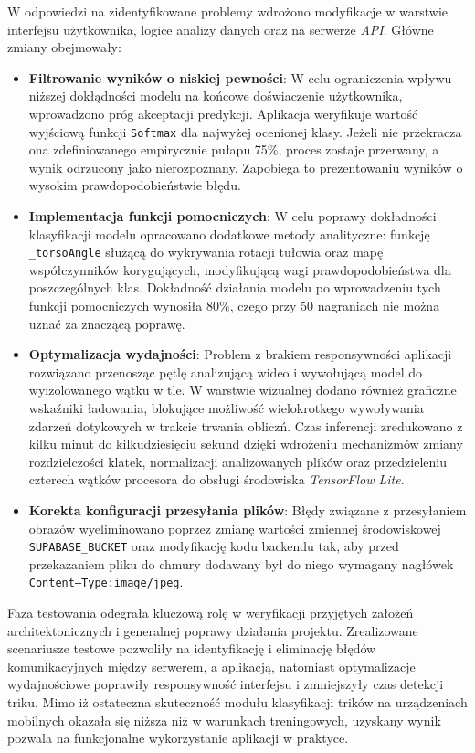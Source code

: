                 W odpowiedzi na zidentyfikowane problemy wdrożono modyfikacje w warstwie interfejsu użytkownika, logice analizy danych oraz na serwerze \textit{API}. Główne zmiany obejmowały:
                \begin{itemize}
                    \item \textbf{Filtrowanie wyników o niskiej pewności}: W celu ograniczenia wpływu niższej dokłądności modelu na końcowe doświaczenie użytkownika, wprowadzono próg akceptacji predykcji. Aplikacja weryfikuje wartość wyjściową funkcji \texttt{Softmax} dla najwyżej ocenionej klasy. Jeżeli nie przekracza ona zdefiniowanego empirycznie pułapu 75\%, proces zostaje przerwany, a wynik odrzucony jako nierozpoznany. Zapobiega to prezentowaniu wyników o wysokim prawdopodobieństwie błędu.
                    \item \textbf{Implementacja funkcji pomocniczych}: W celu poprawy dokładności klasyfikacji modelu opracowano dodatkowe metody analityczne: funkcję \texttt{\_torsoAngle} służącą do wykrywania rotacji tułowia oraz mapę współczynników korygujących, modyfikującą wagi prawdopodobieństwa dla poszczególnych klas. Dokładność działania modelu po wprowadzeniu tych funkcji pomocniczych wynosiła 80\%, czego przy 50 nagraniach nie można uznać za znaczącą poprawę.
                    \item \textbf{Optymalizacja wydajności}: Problem z brakiem responsywności aplikacji rozwiązano przenosząc pętlę analizującą wideo i wywołującą model do wyizolowanego wątku w tle. W warstwie wizualnej dodano również graficzne wskaźniki ładowania, blokujące możliwość wielokrotkego wywoływania zdarzeń dotykowych w trakcie trwania obliczń. Czas inferencji zredukowano z kilku minut do kilkudziesięciu sekund dzięki wdrożeniu mechanizmów zmiany rozdzielczości klatek, normalizacji analizowanych plików oraz przedzieleniu czterech wątków procesora do obsługi środowiska \textit{TensorFlow Lite}.
                    \item \textbf{Korekta konfiguracji przesyłania plików}: Błędy związane z przesyłaniem obrazów wyeliminowano poprzez zmianę wartości zmiennej środowiskowej \texttt{SUPABASE\_BUCKET} oraz modyfikację kodu backendu tak, aby przed przekazaniem pliku do chmury dodawany był do niego wymagany nagłówek \texttt{Content–Type:image/jpeg}.
                \end{itemize}

        Faza testowania odegrała kluczową rolę w weryfikacji przyjętych założeń architektonicznych i generalnej poprawy działania projektu. Zrealizowane scenariusze testowe pozwoliły na identyfikację i eliminację błędów komunikacyjnych między serwerem, a aplikacją, natomiast optymalizacje wydajnościowe poprawiły responsywność interfejsu i zmniejszyły czas detekcji triku. Mimo iż ostateczna skuteczność modułu klasyfikacji trików na urządzeniach mobilnych okazała się niższa niż w warunkach treningowych, uzyskany wynik pozwala na funkcjonalne wykorzystanie aplikacji w praktyce. 